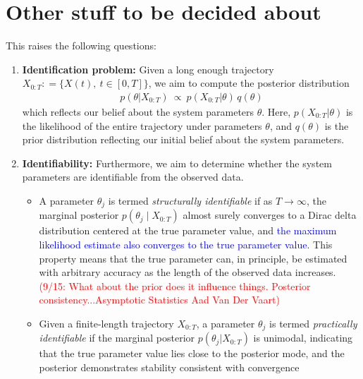 \documentclass[pdflatex,sn-mathphys-num]{sn-jnl}%
\theoremstyle{thmstyleone}%
\theoremstyle{thmstyletwo}%
\theoremstyle{thmstylethree}%
\begin{document}
\section{Other stuff to be decided about}

This raises the following questions:
\begin{enumerate}[label=\textbf{Q\arabic*}.]

\item 
\textbf{Identification problem: }
Given a long enough trajectory $X_{0:T} : =  \{X(t), ~ t\in[0,T]\}$, we aim to compute the posterior distribution
\begin{align*}
    p(\theta|X_{0:T} ) ~\propto~ p\left(X_{0:T}\big| \theta\right)\, q(\theta)
\end{align*}
which reflects our belief about the system parameters $\theta$.
Here, $ p\left(X_{0:T}\big| \theta\right)$ is the likelihood of the entire trajectory under parameters $\theta$, and $q(\theta)$ is the prior distribution reflecting our initial belief about the system parameters.

\medskip

\item
\textbf{Identifiability: } \label{definition identifiability}
Furthermore, we aim to determine whether the system parameters are identifiable from the observed data.

\begin{itemize}
\item A parameter $\theta_j$ is termed \textit{structurally identifiable} if as $T \to \infty$, the marginal posterior $p(\theta_j \mid X_{0:T})$ almost surely converges to a Dirac delta distribution centered at the true parameter value, and \textcolor{blue}{the maximum likelihood estimate also converges to the true parameter value.}
This property means that the true parameter can, in principle, be estimated with arbitrary accuracy as the length of the observed data increases. \\[-1pt]

\textcolor{red}{(9/15: What about the prior does it influence things. Posterior consistency...Asymptotic Statistics Aad Van Der Vaart)}


\item Given a finite-length trajectory $X_{0:T}$, a parameter $\theta_j$ is termed \textit{practically identifiable} if the marginal posterior $p(\theta_j|X_{0:T} )$ is unimodal, indicating that the true parameter value lies close to the posterior mode, 
and the posterior demonstrates stability consistent with convergence
\end{itemize}
\end{enumerate}
\end{document}
